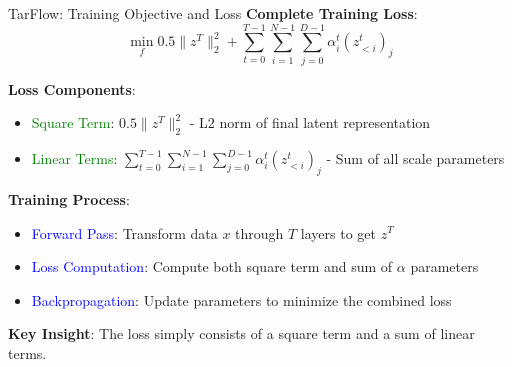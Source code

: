 \documentclass[aspectratio=169]{beamer}
\begin{document}
\begin{frame}{TarFlow: Training Objective and Loss}
\textbf{Complete Training Loss}:
\begin{equation}
    \min_f 0.5\|z^T\|_2^2 + \sum_{t=0}^{T-1} \sum_{i=1}^{N-1} \sum_{j=0}^{D-1} \alpha_i^t(z^t_{<i})_j
\end{equation}

\textbf{Loss Components}:
\begin{itemize}
    \item \textcolor{green}{Square Term}: $0.5\|z^T\|_2^2$ - L2 norm of final latent representation
    \item \textcolor{green}{Linear Terms}: $\sum_{t=0}^{T-1} \sum_{i=1}^{N-1} \sum_{j=0}^{D-1} \alpha_i^t(z^t_{<i})_j$ - Sum of all scale parameters
\end{itemize}

\textbf{Training Process}:
\begin{itemize}
    \item \textcolor{blue}{Forward Pass}: Transform data $x$ through $T$ layers to get $z^T$
    \item \textcolor{blue}{Loss Computation}: Compute both square term and sum of $\alpha$ parameters
    \item \textcolor{blue}{Backpropagation}: Update parameters to minimize the combined loss
\end{itemize}

\textbf{Key Insight}: The loss simply consists of a square term and a sum of linear terms.
\end{frame}
\end{document}
